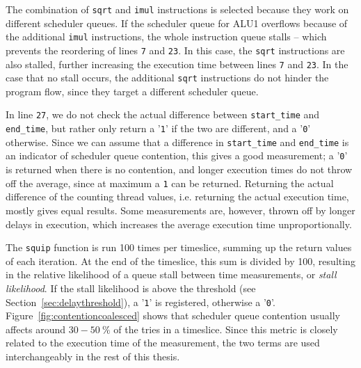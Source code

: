\documentclass[11pt,
  titlepage=false,
  parskip=half,      %
]{scrreprt}
\begin{document}
The combination of \texttt{sqrt} and \texttt{imul} instructions is selected because they work on different scheduler queues.
If the scheduler queue for ALU1 overflows because of the additional \texttt{imul} instructions,
the whole instruction queue stalls -- which prevents the reordering of lines \texttt{7} and \texttt{23}.
In this case, the \texttt{sqrt} instructions are also stalled, further increasing the execution time between lines \texttt{7} and \texttt{23}.
In the case that no stall occurs, the additional \texttt{sqrt} instructions do not hinder the program flow,
since they target a different scheduler queue.

In line \texttt{27}, we do not check the actual difference between \texttt{start\_time} and \texttt{end\_time},
but rather only return a '\texttt{1}' if the two are different, and a '\texttt{0}' otherwise.
Since we can assume that a difference in \texttt{start\_time} and \texttt{end\_time} is an indicator of scheduler queue contention,
this gives a good measurement;
a '\texttt{0}' is returned when there is no contention, and longer execution times do not throw off the average,
since at maximum a \texttt{1} can be returned.
Returning the actual difference of the counting thread values, i.e. returning the actual execution time, mostly gives equal results.
Some measurements are, however, thrown off by longer delays in execution,
which increases the average execution time unproportionally.

The \texttt{squip} function is run 100 times per timeslice, summing up the return values of each iteration.
At the end of the timeslice, this sum is divided by 100,
resulting in the relative likelihood of a queue stall between time measurements, or \textit{stall likelihood}.
If the stall likelihood is above the threshold (see Section~\ref{sec:delaythreshold}), a '\texttt{1}' is registered, otherwise a '\texttt{0}'.
Figure~\ref{fig:contentioncoalesced} shows that scheduler queue contention usually affects around $30-50~\%$ of the tries in a timeslice.
Since this metric is closely related to the execution time of the measurement, the two terms are used interchangeably in the rest of this thesis.


\end{document}
